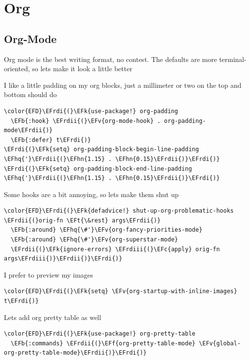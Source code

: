 \documentclass{scrartcl}
\newcommand{\EFk}[1]{\textcolor{EFk}{#1}} %
\newcommand{\EFt}[1]{\textcolor{EFt}{#1}} %
\newcommand{\EFb}[1]{\textcolor{EFb}{#1}} %
\newcommand{\EFc}[1]{\textcolor{EFc}{#1}} %
\newcommand{\EFv}[1]{\textcolor{EFv}{#1}} %
\newcommand{\EFf}[1]{\textcolor{EFf}{#1}} %
\newcommand{\EFhn}[1]{#1} %
\newcommand{\EFhq}[1]{#1} %
\newcommand{\EFrdi}[1]{#1} %
\newcommand{\EFrdii}[1]{#1} %
\newcommand{\EFrdiii}[1]{#1} %
\begin{document}
\section{Org}
\label{sec:org24b5597}
\subsection{Org-Mode}
\label{sec:org64193bc}
Org mode is the best writing format, no contest. The defaults are more
terminal-oriented, so lets make it look a little better

I like a little padding on my org blocks, just a millimeter or two on the top and bottom should do
\begin{Code}
\begin{Verbatim}[]
\color{EFD}\EFrdi{(}\EFk{use-package!} org-padding
  \EFb{:hook} \EFrdii{(}\EFv{org-mode-hook} . org-padding-mode\EFrdii{)}
  \EFb{:defer} t\EFrdi{)}
\EFrdi{(}\EFk{setq} org-padding-block-begin-line-padding \EFhq{'}\EFrdii{(}\EFhn{1.15} . \EFhn{0.15}\EFrdii{)}\EFrdi{)}
\EFrdi{(}\EFk{setq} org-padding-block-end-line-padding \EFhq{'}\EFrdii{(}\EFhn{1.15} . \EFhn{0.15}\EFrdii{)}\EFrdi{)}
\end{Verbatim}
\end{Code}

Some hooks are a bit annoying, so lets make them shut up
\begin{Code}
\begin{Verbatim}[]
\color{EFD}\EFrdi{(}\EFk{defadvice!} shut-up-org-problematic-hooks \EFrdii{(}orig-fn \EFt{\&rest} args\EFrdii{)}
  \EFb{:around} \EFhq{\#'}\EFv{org-fancy-priorities-mode}
  \EFb{:around} \EFhq{\#'}\EFv{org-superstar-mode}
  \EFrdii{(}\EFk{ignore-errors} \EFrdiii{(}\EFc{apply} orig-fn args\EFrdiii{)}\EFrdii{)}\EFrdi{)}
\end{Verbatim}
\end{Code}

I prefer to preview my images
\begin{Code}
\begin{Verbatim}[]
\color{EFD}\EFrdi{(}\EFk{setq} \EFv{org-startup-with-inline-images} t\EFrdi{)}
\end{Verbatim}
\end{Code}

Lets add org pretty table as well
\begin{Code}
\begin{Verbatim}[]
\color{EFD}\EFrdi{(}\EFk{use-package!} org-pretty-table
  \EFb{:commands} \EFrdii{(}\EFf{org-pretty-table-mode} \EFv{global-org-pretty-table-mode}\EFrdii{)}\EFrdi{)}
\end{Verbatim}
\end{Code}
\end{document}
